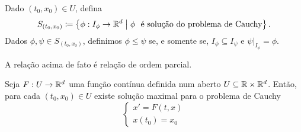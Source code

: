\begin{defi}
	Dado $(t_0,x_0) \in U$, defina
	\begin{equation*}
	S_{(t_0,x_0)} \coloneqq \set{\phi: I_\phi \to \R^d}{\phi \text{\ \ é solução do problema de Cauchy}}.
	\end{equation*}
Dados $\phi ,\psi \in S_{(t_0,x_0)}$, definimos $\phi \leq \psi $ se, e somente se, $I_{\phi } \subseteq I_{\psi}$ e $\psi|_{I_\phi} = \phi $.
\end{defi}

\begin{prop}
	A relação acima de fato é relação de ordem parcial.
\end{prop}

\begin{teo}
	Seja $F: U \to \mathbb{R}^d$ uma função contínua definida num aberto $U \subseteq \mathbb{R} \times \mathbb{R}^d$. Então, para cada $(t_0,x_0) \in U$ existe solução maximal para o problema de Cauchy
	\begin{equation*}
	\begin{cases}
		x' = F(t,x) \\
		x(t_0)=x_0
	\end{cases}
	\end{equation*}
\end{teo}









































